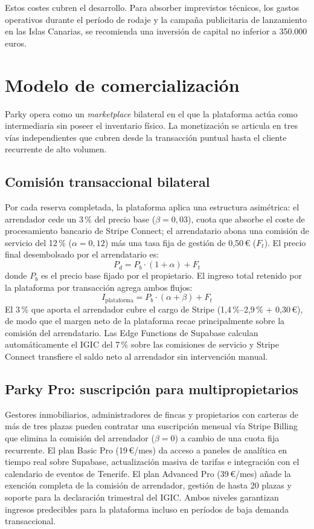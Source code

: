 Estos costes cubren el desarrollo. Para absorber imprevistos técnicos, los gastos operativos durante el período de rodaje y la campaña publicitaria de lanzamiento en las Islas Canarias, se recomienda una inversión de capital no inferior a 350.000 euros.

\section{Modelo de comercialización}
\label{sec:modelo_comercializacion}

Parky opera como un \textit{marketplace} bilateral en el que la plataforma actúa como intermediaria sin poseer el inventario físico. La monetización se articula en tres vías independientes que cubren desde la transacción puntual hasta el cliente recurrente de alto volumen.

\subsection{Comisión transaccional bilateral}
\label{subsec:comision_transaccional}

Por cada reserva completada, la plataforma aplica una estructura asimétrica: el arrendador cede un 3\,\% del precio base ($\beta = 0{,}03$), cuota que absorbe el coste de procesamiento bancario de Stripe Connect; el arrendatario abona una comisión de servicio del 12\,\% ($\alpha = 0{,}12$) más una tasa fija de gestión de 0,50\,€ ($F_t$). El precio final desembolsado por el arrendatario es:
\[
    P_d = P_b \cdot (1 + \alpha) + F_t
\]
donde $P_b$ es el precio base fijado por el propietario. El ingreso total retenido por la plataforma por transacción agrega ambos flujos:
\[
    I_{\text{plataforma}} = P_b \cdot (\alpha + \beta) + F_t
\]
El 3\,\% que aporta el arrendador cubre el cargo de Stripe (1,4\,\%--2,9\,\% + 0,30\,€), de modo que el margen neto de la plataforma recae principalmente sobre la comisión del arrendatario. Las Edge Functions de Supabase calculan automáticamente el IGIC del 7\,\% sobre las comisiones de servicio y Stripe Connect transfiere el saldo neto al arrendador sin intervención manual.

\subsection{Parky Pro: suscripción para multipropietarios}
\label{subsec:parky_pro}

Gestores inmobiliarios, administradores de fincas y propietarios con carteras de más de tres plazas pueden contratar una suscripción mensual vía Stripe Billing que elimina la comisión del arrendador ($\beta = 0$) a cambio de una cuota fija recurrente. El plan Basic Pro (19\,€/mes) da acceso a paneles de analítica en tiempo real sobre Supabase, actualización masiva de tarifas e integración con el calendario de eventos de Tenerife. El plan Advanced Pro (39\,€/mes) añade la exención completa de la comisión de arrendador, gestión de hasta 20 plazas y soporte para la declaración trimestral del IGIC. Ambos niveles garantizan ingresos predecibles para la plataforma incluso en períodos de baja demanda transaccional.

